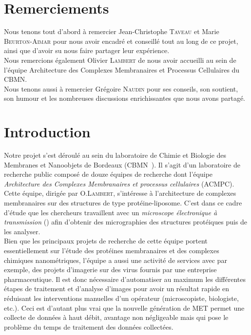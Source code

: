 \documentclass[12pt,a4paper]{report}
\begin{document}
\chapter*{Remerciements}

\thispagestyle{empty}

Nous tenons tout d'abord à remercier Jean-Christophe \textsc{Taveau} et Marie \textsc{Beurton-Aimar} pour nous avoir encadré et conseillé tout au long de ce projet, ainsi que d'avoir su nous faire partager leur expérience. \\

Nous remercions également Olivier \textsc{Lambert} de nous avoir accueilli au sein de l'équipe Architecture des Complexes Membranaires et Processus Cellulaires du CBMN. \\

Nous tenons aussi à remercier Grégoire \textsc{Naudin} pour ses conseils, son soutient, son humour et les nombreuses discussions enrichissantes que nous avons partagé.  

\thispagestyle{empty}

\tableofcontents

\thispagestyle{empty}


\chapter*{Introduction}

\setcounter{page}{5}

Notre projet s'est déroulé au sein du laboratoire de Chimie et Biologie des Membranes et Nanoobjets de Bordeaux (CBMN~\cite{cbmn:url}).
Il s'agit d'un laboratoire de recherche public composé de douze équipes de recherche dont l'équipe \emph{Architecture des Complexes Membranaires et processus cellulaires} (ACMPC). %
Cette équipe, dirigée par O.\textsc{Lambert}, s'intéresse à l'architecture de complexes membranaires sur des structures de type protéine-liposome. C'est dans ce cadre d'étude que les chercheurs travaillent avec un \emph{microscope électronique à transmission} (\me) afin d'obtenir des micrographies des structures protéiques puis de les analyser. \\

Bien que les principaux projets de recherche de cette équipe portent essentiellement sur l'étude des protéines membranaires et des complexes chimiques nanométriques, l'équipe a aussi une activité de services avec par exemple, des projets d'imagerie sur des virus fournis par une entreprise pharmaceutique. Il est donc nécessaire d'automatiser au maximum les différentes étapes de traitement et d'analyse d'images pour avoir un résultat rapide en réduisant les interventions manuelles d'un opérateur (microscopiste, biologiste, etc.). Ceci est d'autant plus vrai que la nouvelle génération de MET permet une collecte de données à haut débit, avantage non négligeable mais qui pose le problème du temps de traitement des données collectées. 
\end{document}
